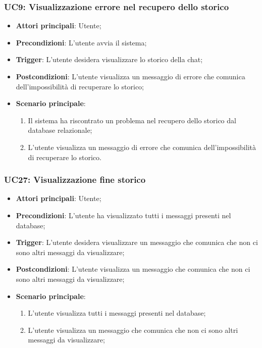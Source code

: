 \subsubsection{UC9: Visualizzazione errore nel recupero dello storico}
\begin{itemize}
    \item \textbf{Attori principali}: Utente;
    \item \textbf{Precondizioni}: L'utente avvia il sistema;
    \item \textbf{Trigger}: L'utente desidera visualizzare lo storico della chat;
    \item \textbf{Postcondizioni}: L'utente visualizza un messaggio di errore che comunica dell'impossibilità di recuperare lo storico;
    \item \textbf{Scenario principale}: 
    \begin{enumerate}
        \item Il sistema ha riscontrato un problema nel recupero dello storico dal database relazionale;
        \item L'utente visualizza un messaggio di errore che comunica dell'impossibilità di recuperare lo storico.
    \end{enumerate}
\end{itemize}

\hypertarget{UC27}{}
\subsubsection{UC27: Visualizzazione fine storico}
\begin{itemize}
    \item \textbf{Attori principali}: Utente;
    \item \textbf{Precondizioni}: L'utente ha visualizzato tutti i messaggi presenti nel database;
    \item \textbf{Trigger}: L'utente desidera visualizzare un messaggio che comunica che non ci sono altri messaggi da visualizzare;
    \item \textbf{Postcondizioni}: L'utente visualizza un messaggio che comunica che non ci sono altri messaggi da visualizzare;
    \item \textbf{Scenario principale}:
    \begin{enumerate}
        \item L'utente visualizza tutti i messaggi presenti nel database;
        \item L'utente visualizza un messaggio che comunica che non ci sono altri messaggi da visualizzare;
    \end{enumerate}
\end{itemize}


